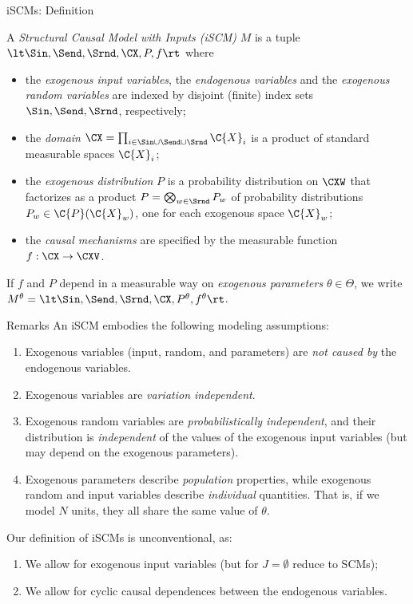 \begin{frame}{iSCMs: Definition}
  \begin{Def}[\ref{def:iscm}]
    A \emph{Structural Causal Model with Inputs (iSCM)} $M$ is a tuple $\lt \Sin, \Send, \Srnd, \CX, P, f \rt$ 
  where
  \begin{itemize}
    \item the \emph{exogenous input variables}, the \emph{endogenous variables} and the \emph{exogenous random variables} are indexed by disjoint (finite) index sets $\Sin, \Send, \Srnd$, respectively;
    \item the \emph{domain} $\CX = \prod_{i\in \Sin \cup \Send \cup \Srnd} \C{X}_i$ is a product of standard measurable spaces $\C{X}_i$;
    \item the \emph{exogenous distribution} $P$ is a probability distribution on $\CXW$ that factorizes as a product $P = \bigotimes_{w\in\Srnd} P_w$ of probability distributions $P_w \in \C{P}(\C{X}_w)$, one for each exogenous space $\C{X}_w$;
    \item the \emph{causal mechanisms} are specified by the measurable function $f : \CX \to \CXV$.
  \end{itemize}
\end{Def}
If $f$ and $P$ depend in a measurable way on \emph{exogenous parameters} $\theta\in\Theta$, 
we write $M^{\theta} = \lt \Sin, \Send, \Srnd, \CX, P^{\theta}, f^{\theta} \rt$.
\end{frame}

\begin{frame}{Remarks}
  An iSCM embodies the following modeling assumptions:
  \begin{enumerate}
    \item Exogenous variables (input, random, and parameters) are \emph{not caused by} the endogenous variables.
    \item Exogenous variables are \emph{variation independent}.
    \item Exogenous random variables are \emph{probabilistically independent}, and their distribution is \emph{independent} of the values of the exogenous input variables
      (but may depend on the exogenous parameters).
    \item Exogenous parameters describe \emph{population} properties, while exogenous random and input variables describe \emph{individual} quantities.
      That is, if we model $N$ units, they all share the same value of $\theta$.
  \end{enumerate}

  \bigskip
  Our definition of iSCMs is unconventional, as:
  \begin{enumerate}
    \item We allow for exogenous input variables (but for $J=\emptyset$ reduce to SCMs);
    \item We allow for cyclic causal dependences between the endogenous variables.
  \end{enumerate}
\end{frame}

